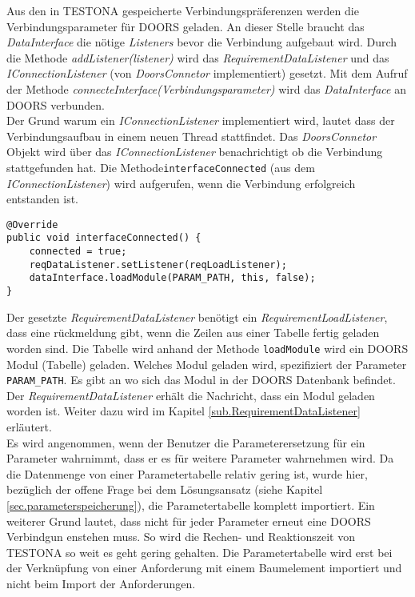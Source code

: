 Aus den in TESTONA gespeicherte Verbindungspräferenzen werden die Verbindungsparameter für DOORS geladen. An dieser Stelle braucht das \textit{DataInterface} die nötige \textit{Listeners} bevor die Verbindung aufgebaut wird. Durch die Methode \textit{addListener(listener)} wird das \textit{RequirementDataListener} und das \textit{IConnectionListener} (von \textit{DoorsConnetor} implementiert) gesetzt. Mit dem Aufruf der Methode \textit{connecteInterface(Verbindungsparameter)} wird das \textit{DataInterface} an DOORS verbunden.\\

Der Grund warum ein \textit{IConnectionListener} implementiert wird, lautet dass der Verbindungsaufbau in einem neuen Thread stattfindet. Das \textit{DoorsConnetor} Objekt wird über das \textit{IConnectionListener} benachrichtigt ob die Verbindung stattgefunden hat. Die Methode\texttt{interfaceConnected} (aus dem \textit{IConnectionListener}) wird aufgerufen, wenn die Verbindung erfolgreich entstanden ist.

\begin{lstlisting}[caption={Verbindungsaufbau war erfolgreich}, captionpos=b]
@Override
public void interfaceConnected() {
	connected = true;
	reqDataListener.setListener(reqLoadListener);
	dataInterface.loadModule(PARAM_PATH, this, false);
}
\end{lstlisting}

Der gesetzte \textit{RequirementDataListener} benötigt ein \textit{RequirementLoadListener}, dass eine rückmeldung gibt, wenn die Zeilen aus einer Tabelle fertig geladen worden sind. Die Tabelle wird anhand der Methode \texttt{loadModule} wird ein DOORS Modul (Tabelle) geladen. Welches Modul geladen wird, spezifiziert der Parameter \texttt{PARAM\_PATH}. Es gibt an wo sich das Modul in der DOORS Datenbank befindet. Der \textit{RequirementDataListener} erhält die Nachricht, dass ein Modul geladen worden ist. Weiter dazu wird im Kapitel \ref{sub.RequirementDataListener} erläutert.\\


Es wird angenommen, wenn der Benutzer die Parameterersetzung für ein Parameter wahrnimmt, dass er es für weitere Parameter wahrnehmen wird. Da die Datenmenge von einer Parametertabelle relativ gering ist, wurde hier, bezüglich der offene Frage bei dem Lösungsansatz (siehe Kapitel \ref{sec.parameterspeicherung}), die Parametertabelle komplett importiert. 
Ein weiterer Grund lautet, dass nicht für jeder Parameter erneut eine DOORS Verbindgun enstehen muss. So wird die Rechen- und Reaktionszeit von TESTONA so weit es geht gering gehalten. Die Parametertabelle wird erst bei der Verknüpfung von einer Anforderung mit einem Baumelement importiert und nicht beim Import der Anforderungen. 

